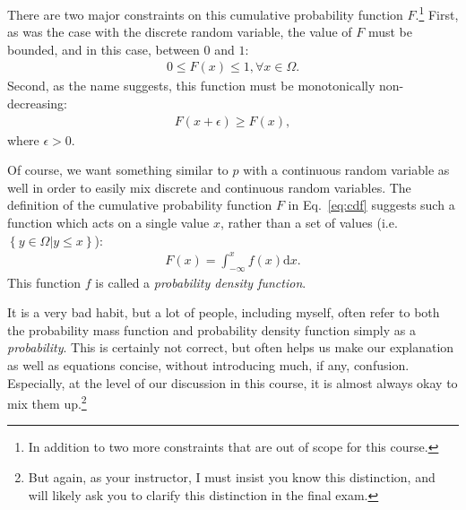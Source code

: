 \documentclass{report}
\newcommand{\dd}[1]{\ensuremath{\mbox{d}#1}}
\begin{document}
There are two major constraints on this cumulative probability function
$F$.\footnote{
    In addition to two more constraints that are out of scope for this course.
} First, as was the case with the discrete random variable, the value of $F$
must be bounded, and in this case, between $0$ and $1$:
\begin{align*}
    0 \leq F(x) \leq 1, \forall x \in \Omega.
\end{align*}
Second, as the name suggests, this function must be monotonically non-decreasing:
\begin{align*}
    F(x+\epsilon) \geq F(x),
\end{align*}
where $\epsilon > 0$.

Of course, we want something similar to $p$ with a continuous random variable as
well in order to easily mix discrete and continuous random variables. The
definition of the cumulative probability function $F$ in Eq.~\eqref{eq:cdf}
suggests such a function which acts on a single value $x$, rather than a set of
values (i.e. $\left\{ y \in \Omega | y \leq x \right\}$): 
\begin{align*}
    F(x) = \int_{-\infty}^x f(x) \dd{x}.
\end{align*}
This function $f$ is called a {\it probability density function}. 

It is a very bad habit, but a lot of people, including myself, often refer to
both the probability mass function and probability density function simply as a
{\it probability}. This is certainly not correct, but often helps us make our
explanation as well as equations concise, without introducing much, if any,
confusion. Especially, at the level of our discussion in this course, it is
almost always okay to mix them up.\footnote{
    But again, as your instructor, I must insist you know this distinction, and
    will likely ask you to clarify this distinction in the final exam.
}
\end{document}
